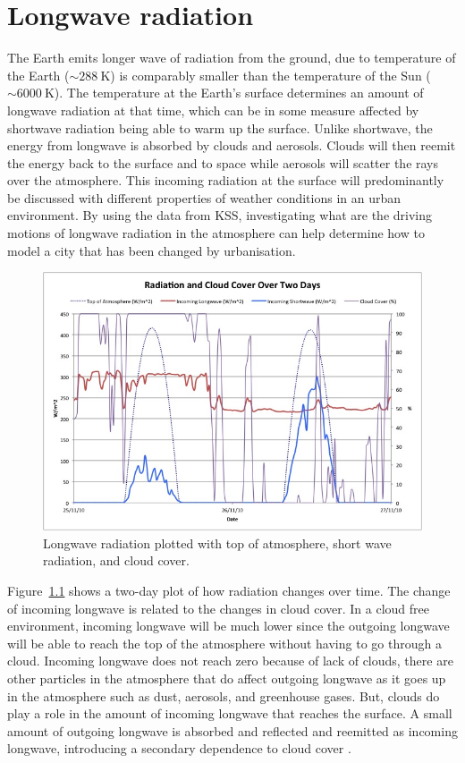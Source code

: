 \documentclass[a4paper,titlepage, twoside]{report}
\begin{document}
\chapter{Longwave radiation}
The Earth emits longer wave of radiation from the ground, due to temperature of the Earth ($\sim\SI{288}{\kelvin}$) is comparably smaller than the temperature of the Sun ($\sim\SI{6000}{\kelvin}$).  The temperature at the Earth's surface determines an amount of longwave radiation at that time, which can be in some measure affected by shortwave radiation being able to warm up the surface.  Unlike shortwave, the energy from longwave is absorbed by clouds and aerosols. Clouds will then reemit the energy back to the surface and to space while aerosols will scatter the rays over the atmosphere.  This incoming radiation at the surface will predominantly be discussed with different properties of weather conditions in an urban environment.  By using the data from KSS, investigating what are the driving motions of longwave radiation in the atmosphere can help determine how to model a city that has been changed by urbanisation.

\begin{figure}
\includegraphics[width=\textwidth]{1.jpg}
\caption{Longwave radiation plotted with top of atmosphere, short wave radiation, and cloud cover.}
\label{fig:longwave-1}
\end{figure}

Figure~\ref{fig:longwave-1} shows a two-day plot of how radiation changes over time.  The change of incoming longwave is related to the changes in cloud cover.  In a cloud free environment, incoming longwave will be much lower since the outgoing longwave will be able to reach the top of the atmosphere without having to go through a cloud.  Incoming longwave does not reach zero because of lack of clouds, there are other particles in the atmosphere that do affect outgoing longwave as it goes up in the atmosphere such as dust, aerosols, and greenhouse gases.  But, clouds do play a role in the amount of incoming longwave that reaches the surface.  A small amount of outgoing longwave is absorbed and reflected and reemitted as incoming longwave, introducing a secondary dependence to cloud cover \parencite{kotthaus1}.
\end{document}
